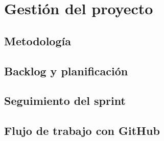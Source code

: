 \chapter{Gestión del proyecto}
\label{cap:gestion}

\section{Metodología}

\section{Backlog y planificación}

\section{Seguimiento del sprint}

\section{Flujo de trabajo con GitHub}
